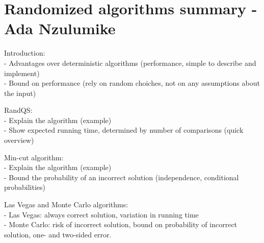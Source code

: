 \section*{Randomized algorithms summary - Ada Nzulumike}

Introduction:
\\
- Advantages over deterministic algorithms (performance, simple to describe and implement)
\\
- Bound on performance (rely on random choiches, not on any assumptions about the input)

RandQS:
\\
- Explain the algorithm (example)
\\
- Show expected running time, determined by number of comparisons (quick overview)

Min-cut algorithm:
\\
- Explain the algorithm (example)
\\
- Bound the probability of an incorrect solution (independence, conditional probabilities)

Las Vegas and Monte Carlo algorithms:
\\
- Las Vegas: always correct solution, variation in running time
\\
- Monte Carlo: risk of incorrect solution, bound on probability of incorrect solution, one- and two-sided error.